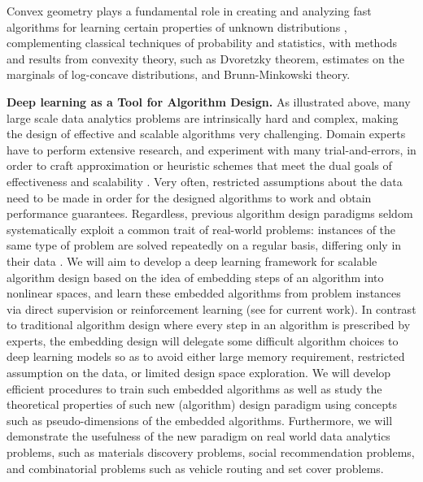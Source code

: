 \documentclass[12pt]{article}
\begin{document}
Convex geometry plays a fundamental role in creating and analyzing fast algorithms for learning certain properties of unknown distributions \cite{rademacher_vempala_2004, vempala_jacm_2010, vempala_2010,vempala_2001},  complementing classical techniques of probability and statistics, with methods and results from convexity theory, such as Dvoretzky theorem, estimates on the marginals of log-concave distributions, and Brunn-Minkowski theory.

\medskip

\noindent
{\bf Deep learning as a Tool for Algorithm Design.}
As illustrated above, many large scale data analytics problems are intrinsically hard and complex, making the design of effective and scalable algorithms very challenging. Domain experts have to perform extensive research, and experiment with many trial-and-errors, in order to craft approximation or heuristic schemes that meet the dual goals of effectiveness and scalability \cite{DaiDaiSon16, DaiDaiZhaLietal17}.
Very often, restricted assumptions about the data need to be made in order for the designed algorithms to work and obtain performance guarantees.
Regardless, previous algorithm design paradigms seldom systematically exploit a common trait of real-world problems: instances of the same type of problem are solved repeatedly on a regular basis, differing only in their data \cite{DaiWanTriSon16, DuDaiTriEtal16}.
We will aim to develop a deep learning framework for scalable algorithm design based on the idea of embedding steps of an algorithm  into nonlinear spaces, and learn these embedded algorithms from problem instances via direct supervision or reinforcement learning (see \cite{LiuWenYuLietal17, KhaBodSonNemDil16} for current work). In contrast to traditional algorithm design where every step in an algorithm is prescribed by experts, the embedding design will delegate some difficult algorithm choices to deep learning models so as to avoid either large memory requirement, restricted assumption on the data, or limited design space exploration. We will develop efficient procedures to train such embedded algorithms as well as study the theoretical properties of such new (algorithm) design paradigm using concepts such as pseudo-dimensions of the embedded algorithms.  Furthermore, we will demonstrate the usefulness of the new  paradigm on real world data analytics problems, such as materials discovery problems, social recommendation problems, and combinatorial problems such as vehicle routing and set cover problems.
\end{document}
